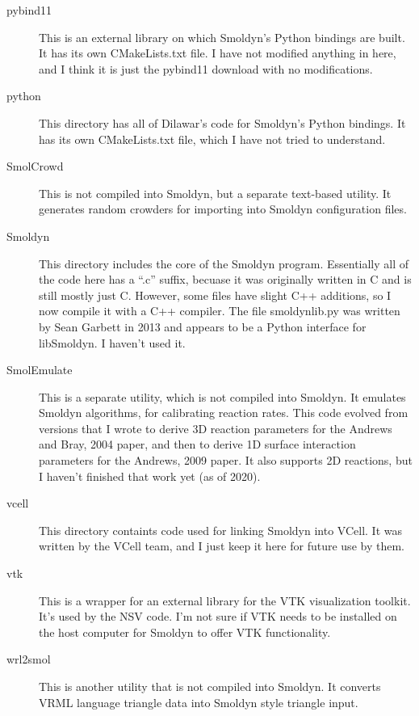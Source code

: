 \documentclass {book}
\begin{document}
\begin{description}
\item[pybind11] This is an external library on which Smoldyn's Python bindings are built. It has its own CMakeLists.txt file. I have not modified anything in here, and I think it is just the pybind11 download with no modifications.

\item[python] This directory has all of Dilawar's code for Smoldyn's Python bindings. It has its own CMakeLists.txt file, which I have not tried to understand.

\item[SmolCrowd] This is not compiled into Smoldyn, but a separate text-based utility. It generates random crowders for importing into Smoldyn configuration files.

\item[Smoldyn] This directory includes the core of the Smoldyn program. Essentially all of the code here has a ``.c'' suffix, becuase it was originally written in C and is still mostly just C. However, some files have slight C++ additions, so I now compile it with a C++ compiler. The file smoldynlib.py was written by Sean Garbett in 2013 and appears to be a Python interface for libSmoldyn. I haven't used it.

\item[SmolEmulate] This is a separate utility, which is not compiled into Smoldyn. It emulates Smoldyn algorithms, for calibrating reaction rates. This code evolved from versions that I wrote to derive 3D reaction parameters for the Andrews and Bray, 2004 paper, and then to derive 1D surface interaction parameters for the Andrews, 2009 paper. It also supports 2D reactions, but I haven't finished that work yet (as of 2020).

\item[vcell] This directory containts code used for linking Smoldyn into VCell. It was written by the VCell team, and I just keep it here for future use by them.

\item[vtk] This is a wrapper for an external library for the VTK visualization toolkit. It's used by the NSV code. I'm not sure if VTK needs to be installed on the host computer for Smoldyn to offer VTK functionality.

\item[wrl2smol] This is another utility that is not compiled into Smoldyn. It converts VRML language triangle data into Smoldyn style triangle input.

\end{description}
\end{document}
